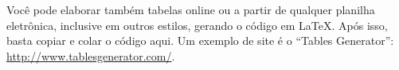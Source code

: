 \documentclass[
	12pt,				%
	openright,			%
	oneside,			%
	a4paper,			%
	english,			%
	brazil				%
	]{abntex2}
\begin{document}
Você pode elaborar também tabelas online ou a partir de qualquer planilha eletrônica, inclusive em outros estilos, gerando o código em \LaTeX. Após isso, basta copiar e colar o código aqui. Um exemplo de site é o ``Tables Generator'': \url{http://www.tablesgenerator.com/}.



\begin{table}[]
	\caption{Uma legenda para esta tabela}
	\label{tab:my-table}
\end{table}
\end{document}
